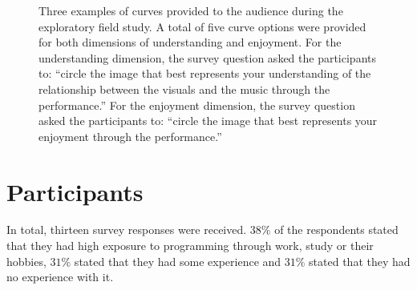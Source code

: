\begin{figure}
\centering
{}
\hfill
{}
\hfill
{}
\caption[Three examples of curves provided to the audience during the
exploratory field study]{Three examples of curves provided to the audience during the
exploratory field study. A total of five curve options were provided for
both dimensions of understanding and enjoyment. For the understanding
dimension, the survey question asked the participants to: ``circle the
image that best represents your understanding of the relationship
between the visuals and the music through the performance.'' For the
enjoyment dimension, the survey question asked the participants to:
``circle the image that best represents your enjoyment through the
performance.''}
\label{fig:field-study-curves}
\end{figure}


\section{Participants}

In total, thirteen survey responses were received. $38\%$ of the respondents stated that they had high exposure to programming through work, study or their hobbies, $31\%$ stated that they had some experience and $31\%$ stated that they had no experience with it.


